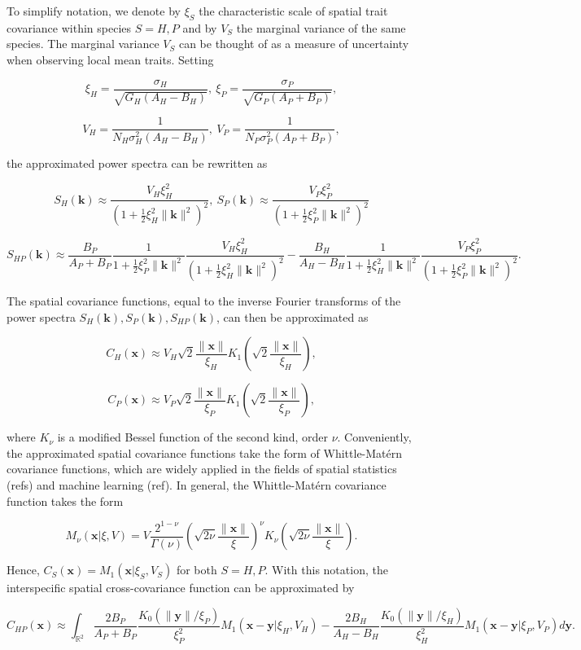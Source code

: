 \documentclass{article}
\begin{document}
To simplify notation, we denote by \(\xi_S\) the characteristic scale of
spatial trait covariance within species \(S=H,P\) and by \(V_S\) the
marginal variance of the same species. The marginal variance \(V_S\) can
be thought of as a measure of uncertainty when observing local mean
traits. Setting

\[\xi_H=\frac{\sigma_H}{\sqrt{G_H(A_H-B_H)}}, \ \xi_P=\frac{\sigma_P}{\sqrt{G_P(A_P+B_P)}},\]

\[V_H=\frac{1}{N_H\sigma_H^2(A_H-B_H)}, \ V_P=\frac{1}{N_P\sigma_P^2(A_P+B_P)},\]

the approximated power spectra can be rewritten as

\[S_H(\pmb k)\approx \frac{V_H\xi_H^2}{(1+\frac{1}{2}\xi_H^2\|\pmb k\|^2)^2}, \ S_P(\pmb k)\approx \frac{V_P\xi_P^2}{(1+\frac{1}{2}\xi_P^2\|\pmb k\|^2)^2}\]

\[S_{HP}(\pmb k)\approx \frac{B_P}{A_P+B_P}\frac{1}{1+\frac{1}{2}\xi_P^2\|\pmb k\|^2}\frac{V_H\xi_H^2}{(1+\frac{1}{2}\xi_H^2\|\pmb k\|^2)^2}-\frac{B_H}{A_H-B_H}\frac{1}{1+\frac{1}{2}\xi_H^2\|\pmb k\|^2}\frac{V_P\xi_P^2}{(1+\frac{1}{2}\xi_P^2\|\pmb k\|^2)^2}.\]

The spatial covariance functions, equal to the inverse Fourier
transforms of the power spectra
\(S_H(\pmb k),S_P(\pmb k),S_{HP}(\pmb k)\), can then be approximated as

\[C_H(\pmb x)\approx V_H\sqrt2\frac{\|\pmb x\|}{\xi_H}K_1\left(\sqrt2\frac{\|\pmb x\|}{\xi_H}\right),\]

\[C_P(\pmb x)\approx V_P\sqrt2\frac{\|\pmb x\|}{\xi_P}K_1\left(\sqrt2\frac{\|\pmb x\|}{\xi_P}\right),\]

where \(K_\nu\) is a modified Bessel function of the second kind, order
\(\nu\). Conveniently, the approximated spatial covariance functions
take the form of Whittle-Matérn covariance functions, which are widely
applied in the fields of spatial statistics (refs) and machine learning
(ref). In general, the Whittle-Matérn covariance function takes the form

\[M_\nu(\pmb x|\xi,V)=V\frac{2^{1-\nu}}{\Gamma(\nu)}\left(\sqrt{2\nu}\frac{\|\pmb x\|}{\xi}\right)^\nu K_\nu\left(\sqrt{2\nu}\frac{\|\pmb x\|}{\xi}\right).\]

Hence, \(C_S(\pmb x)=M_1(\pmb x|\xi_S,V_S)\) for both \(S=H,P\). With
this notation, the interspecific spatial cross-covariance function can
be approximated by

\[C_{HP}(\pmb x)\approx \int_{\mathbb R^2}\frac{2B_P}{A_P+B_P}\frac{K_0(\|\pmb y\|/\xi_P)}{\xi_P^2}M_1(\pmb x-\pmb y|\xi_H,V_H)-\frac{2B_H}{A_H-B_H}\frac{K_0(\|\pmb y\|/\xi_H)}{\xi_H^2}M_1(\pmb x-\pmb y|\xi_P,V_P)d\pmb y.\]
\end{document}
